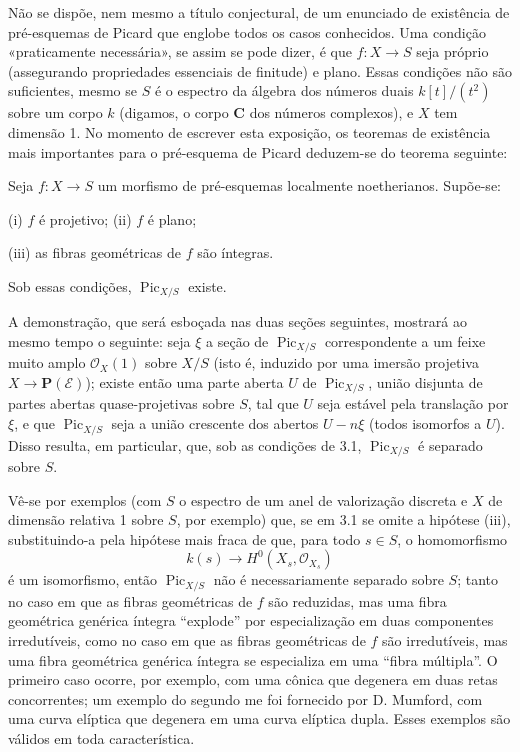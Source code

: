 
Não se dispõe, nem mesmo a título conjectural, de um enunciado de existência
de pré-esquemas de Picard que englobe todos os casos conhecidos. Uma condição
«praticamente necessária», se assim se pode dizer, é que
$f:X\longrightarrow S$ seja próprio (assegurando propriedades essenciais de
finitude) e plano. Essas condições não são suficientes, mesmo se $S$ é o
espectro da álgebra dos números duais $k[t]/(t^2)$ sobre um corpo $k$ (digamos,
o corpo $\mathbf C$ dos números complexos), e $X$ tem dimensão 1. No momento de
escrever esta exposição, os teoremas de existência mais importantes para o
pré-esquema de Picard deduzem-se do teorema seguinte:

 Seja $f:X\longrightarrow S$ um morfismo de pré-esquemas
localmente noetherianos. Supõe-se:

\noindent (i) $f$ é projetivo;
\noindent (ii) $f$ é plano;

\noindent (iii) as fibras geométricas de $f$ são íntegras.

Sob essas condições, $\operatorname{Pic}_{X/S}$ existe.

A demonstração, que será esboçada nas duas seções seguintes, mostrará ao mesmo
tempo o seguinte: seja $\xi$ a seção de $\operatorname{Pic}_{X/S}$
correspondente a um feixe muito amplo $\mathcal O_X(1)$ sobre $X/S$ (isto é,
induzido por uma imersão projetiva
$X\longrightarrow\mathbf P(\mathcal E)$); existe então uma parte aberta $U$ de
$\operatorname{Pic}_{X/S}$, união disjunta de partes abertas quase-projetivas
sobre $S$, tal que $U$ seja estável pela translação por $\xi$, e que
$\operatorname{Pic}_{X/S}$ seja a união crescente dos abertos $U-n\xi$ (todos
isomorfos a $U$). Disso resulta, em particular, que, sob as condições de 3.1,
$\operatorname{Pic}_{X/S}$ é separado sobre $S$.

 Vê-se por exemplos (com $S$ o espectro de um anel de
valorização discreta e $X$ de dimensão relativa 1 sobre $S$, por exemplo) que,
se em 3.1 se omite a hipótese (iii), substituindo-a pela hipótese mais fraca de
que, para todo $s\in S$, o homomorfismo
\[
k(s)\longrightarrow H^0(X_s,\mathcal O_{X_s})
\]
é um isomorfismo, então $\operatorname{Pic}_{X/S}$ não é necessariamente
separado sobre $S$; tanto no caso em que as fibras geométricas de $f$ são
reduzidas, mas uma fibra geométrica genérica íntegra ``explode'' por
especialização em duas componentes irredutíveis, como no caso em que as fibras
geométricas de $f$ são irredutíveis, mas uma fibra geométrica genérica íntegra
se especializa em uma ``fibra múltipla''. O primeiro caso ocorre, por exemplo,
com uma cônica que degenera em duas retas concorrentes; um exemplo do segundo me
foi fornecido por D. Mumford, com uma curva elíptica que degenera em uma curva
elíptica dupla. Esses exemplos são válidos em toda característica.


